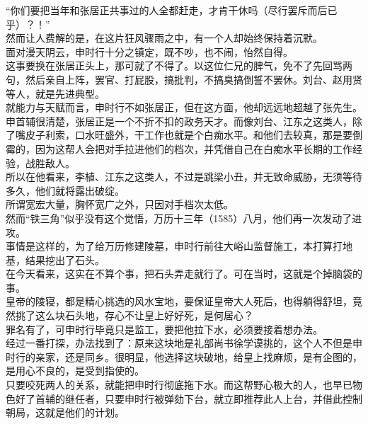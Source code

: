 \begin{multicols}{\theparacolNo}
“你们要把当年和张居正共事过的人全都赶走，才肯干休吗（尽行罢斥而后已乎）？！”\\

然而让人费解的是，在这片狂风骤雨之中，有一个人却始终保持着沉默。\\

面对漫天阴云，申时行十分之镇定，既不吵，也不闹，怡然自得。\\

这事要换在张居正头上，那可就了不得了。以这位仁兄的脾气，免不了先回骂两句，然后亲自上阵，罢官、打屁股，搞批判，不搞臭搞倒誓不罢休。刘台、赵用贤等人，就是先进典型。\\

就能力与天赋而言，申时行不如张居正，但在这方面，他却远远地超越了张先生。\\

申首辅很清楚，张居正是一个不折不扣的政务天才。而像刘台、江东之这类人，除了嘴皮子利索，口水旺盛外，干工作也就是个白痴水平。和他们去较真，那是要倒霉的，因为这帮人会把对手拉进他们的档次，并凭借自己在白痴水平长期的工作经验，战胜敌人。\\

所以在他看来，李植、江东之这类人，不过是跳梁小丑，并无致命威胁，无须等待多久，他们就将露出破绽。\\

所谓宽宏大量，胸怀宽广之外，只因对手档次太低。\\

然而“铁三角”似乎没有这个觉悟，万历十三年（1585）八月，他们再一次发动了进攻。\\

事情是这样的，为了给万历修建陵墓，申时行前往大峪山监督施工，本打算打地基，结果挖出了石头。\\

在今天看来，这实在不算个事，把石头弄走就行了。可在当时，这就是个掉脑袋的事。\\

皇帝的陵寝，都是精心挑选的风水宝地，要保证皇帝大人死后，也得躺得舒坦，竟然挑了这么块石头地，存心不让皇上好好死，是何居心？\\

罪名有了，可申时行毕竟只是监工，要把他拉下水，必须要接着想办法。\\

经过一番打探，办法找到了：原来这块地是礼部尚书徐学谟挑的，这个人不但是申时行的亲家，还是同乡。很明显，他选择这块破地，给皇上找麻烦，是有企图的，是用心不良的，是受到指使的。\\

只要咬死两人的关系，就能把申时行彻底拖下水。而这帮野心极大的人，也早已物色好了首辅的继任者，只要申时行被弹劾下台，就立即推荐此人上台，并借此控制朝局，这就是他们的计划。\\


\end{multicols}
